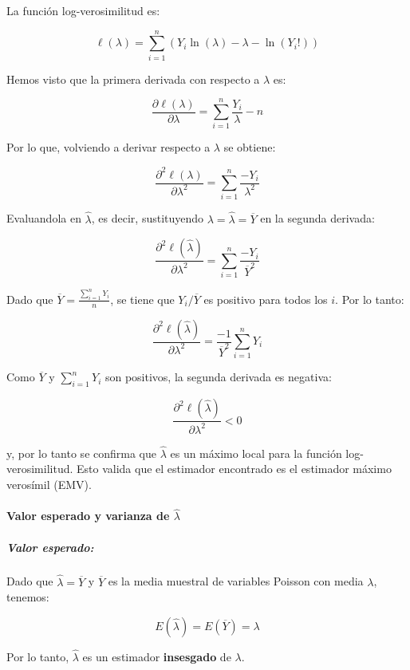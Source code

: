 \documentclass[
]{article}
\begin{document}
La función log-verosimilitud es:

\[
\ell(\lambda) = \sum_{i=1}^n \left(Y_i \ln(\lambda) - \lambda - \ln(Y_i!)\right)
\]

Hemos visto que la primera derivada con respecto a \(\lambda\) es:

\[
\frac{\partial \ell(\lambda)}{\partial \lambda} = \sum_{i=1}^n \frac{Y_i}{\lambda} - n
\]

Por lo que, volviendo a derivar respecto a \(\lambda\) se obtiene:

\[
\frac{\partial^2 \ell(\lambda)}{\partial \lambda^2} = \sum_{i=1}^n \frac{-Y_i}{\lambda^2}
\]

Evaluandola en \(\hat{\lambda}\), es decir, sustituyendo \(\lambda = \hat{\lambda} = \overline{Y}\) en la segunda derivada:

\[
\frac{\partial^2 \ell(\hat{\lambda})}{\partial \lambda^2} = \sum_{i=1}^n \frac{-Y_i}{\overline{Y}^2}
\]

Dado que \(\overline{Y} = \frac{\sum_{i=1}^n Y_i}{n}\), se tiene que \(Y_i / \overline{Y}\) es positivo para todos los \(i\). Por lo tanto:

\[
\frac{\partial^2 \ell(\hat{\lambda})}{\partial \lambda^2} = \frac{-1}{\overline{Y}^2} \sum_{i=1}^n Y_i
\]

Como \(\overline{Y}\) y \(\sum_{i=1}^n Y_i\) son positivos, la segunda derivada es negativa:

\[
\frac{\partial^2 \ell(\hat{\lambda})}{\partial \lambda^2} < 0
\]

y, por lo tanto
se confirma que \(\hat{\lambda}\) es un máximo local para la función log-verosimilitud. Esto valida que el estimador encontrado es el estimador máximo verosímil (EMV).

\paragraph{\texorpdfstring{Valor esperado y varianza de \(\hat{\lambda}\)}{Valor esperado y varianza de \textbackslash hat\{\textbackslash lambda\}}}\label{valor-esperado-y-varianza-de-hatlambda}

\subparagraph{Valor esperado:}\label{valor-esperado}

Dado que \(\hat{\lambda} = \overline{Y}\) y \(\overline{Y}\) es la media muestral de variables Poisson con media \(\lambda\), tenemos:

\[
E(\hat{\lambda}) = E(\overline{Y}) = \lambda
\]

Por lo tanto, \(\hat{\lambda}\) es un estimador \textbf{insesgado} de \(\lambda\).
\end{document}
